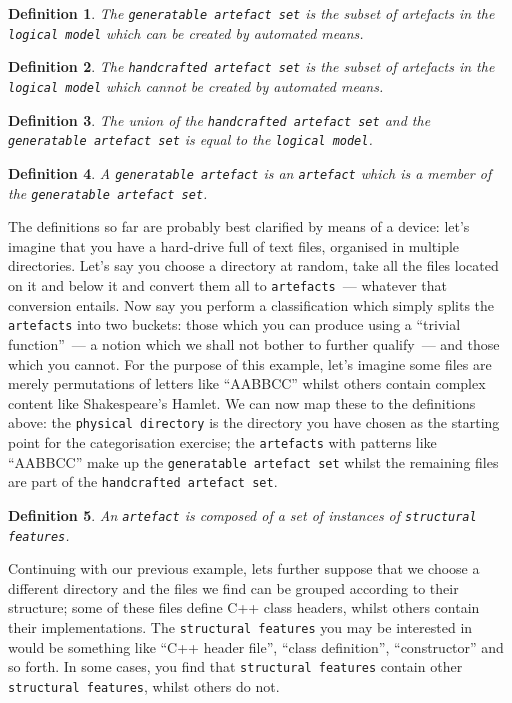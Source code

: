 \documentclass{book}
\newtheorem{concept}{Definition}
\begin{document}
\begin{concept}
  The \texttt{generatable artefact set} is the subset of artefacts in
  the \texttt{logical model} which can be created by automated means.
\end{concept}

\begin{concept}
  The \texttt{handcrafted artefact set} is the subset of artefacts in
  the \texttt{logical model} which cannot be created by automated
  means.
\end{concept}

\begin{concept}
  The union of the \texttt{handcrafted artefact set} and the
  \texttt{generatable artefact set} is equal to the \texttt{logical
    model}.
\end{concept}

\begin{concept}
  A \texttt{generatable artefact} is an \texttt{artefact} which is a
  member of the \texttt{generatable artefact set}.
\end{concept}

The definitions so far are probably best clarified by means of a
device: let's imagine that you have a hard-drive full of text files,
organised in multiple directories. Let's say you choose a directory at
random, take all the files located on it and below it and convert them
all to \texttt{artefacts}~--- whatever that conversion entails. Now
say you perform a classification which simply splits the
\texttt{artefacts} into two buckets: those which you can produce using
a ``trivial function''~--- a notion which we shall not bother to
further qualify~--- and those which you cannot. For the purpose of
this example, let's imagine some files are merely permutations of
letters like ``AABBCC'' whilst others contain complex content like
Shakespeare's Hamlet. We can now map these to the definitions above:
the \texttt{physical directory} is the directory you have chosen as
the starting point for the categorisation exercise; the
\texttt{artefacts} with patterns like ``AABBCC'' make up the
\texttt{generatable artefact set} whilst the remaining files are part
of the \texttt{handcrafted artefact set}.

\begin{concept}
An \texttt{artefact} is composed of a set of instances of
\texttt{structural features}.
\end{concept}

Continuing with our previous example, lets further suppose that we
choose a different directory and the files we find can be grouped
according to their structure; some of these files define C++ class
headers, whilst others contain their implementations. The
\texttt{structural features} you may be interested in would be
something like ``C++ header file'', ``class definition'',
``constructor'' and so forth. In some cases, you find that
\texttt{structural features} contain other \texttt{structural
  features}, whilst others do not.
\end{document}
